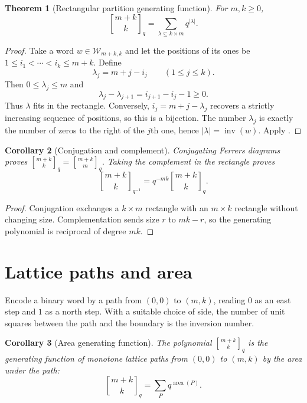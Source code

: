 \documentclass[11pt,oneside,openany]{book}
\newtheorem{theorem}{Theorem}[chapter]
\newtheorem{corollary}[theorem]{Corollary}
\theoremstyle{definition}
\theoremstyle{remark}
\newcommand{\qbinom}[2]{\genfrac{[}{]}{0pt}{}{#1}{#2}_{q}}
\newcommand{\Qbinom}[3]{\genfrac{[}{]}{0pt}{}{#1}{#2}_{#3}}
\newcommand{\inv}{\operatorname{inv}}
\newcommand{\area}{\operatorname{area}}
\newcommand{\abs}[1]{\lvert #1\rvert}
\begin{document}
\begin{theorem}[Rectangular partition generating function]\label{thm:rectangle-partitions}
For $m,k\ge0$,
\[
 \Qbinom{m+k}{k}{q}
 =\sum_{\lambda\subseteq k\times m}q^{\abs\lambda}.
\]
\end{theorem}

\begin{proof}
Take a word $w\in\mathcal W_{m+k,k}$ and let the positions of its ones be
\(
 1\le i_1<\cdots<i_k\le m+k.
\)
Define
\[
 \lambda_j=m+j-i_j\qquad(1\le j\le k).
\]
Then $0\le\lambda_j\le m$ and
\[
 \lambda_j-\lambda_{j+1}=i_{j+1}-i_j-1\ge0.
\]
Thus $\lambda$ fits in the rectangle.  Conversely,
\(
 i_j=m+j-\lambda_j
\)
recovers a strictly increasing sequence of positions, so this is a bijection.  The number $\lambda_j$ is exactly the number of zeros to the right of the $j$th one, hence
\(
 \abs\lambda=\inv(w).
\)
Apply .
\end{proof}

\begin{corollary}[Conjugation and complement]\label{cor:partition-symmetries}
Conjugating Ferrers diagrams proves
\(
 \qbinom{m+k}{k}=\qbinom{m+k}{m}.
\)
Taking the complement in the rectangle proves
\[
 \Qbinom{m+k}{k}{q^{-1}}=q^{-mk}\Qbinom{m+k}{k}{q}.
\]
\end{corollary}

\begin{proof}
Conjugation exchanges a $k\times m$ rectangle with an $m\times k$ rectangle without changing size.  Complementation sends size $r$ to $mk-r$, so the generating polynomial is reciprocal of degree $mk$.
\end{proof}

\section{Lattice paths and area}

Encode a binary word by a path from $(0,0)$ to $(m,k)$, reading $0$ as an east step and $1$ as a north step.  With a suitable choice of side, the number of unit squares between the path and the boundary is the inversion number.

\begin{corollary}[Area generating function]\label{cor:path-area}
The polynomial $\Qbinom{m+k}{k}{q}$ is the generating function of monotone lattice paths from $(0,0)$ to $(m,k)$ by the area under the path:
\[
 \Qbinom{m+k}{k}{q}=\sum_P q^{\area(P)}.
\]
\end{corollary}
\end{document}
